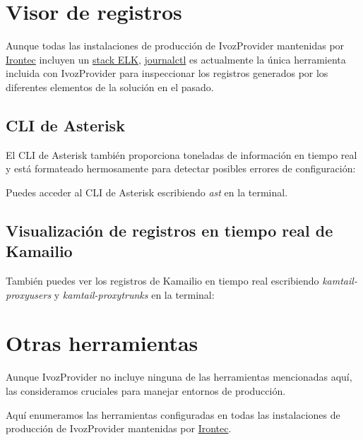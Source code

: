 \documentclass[letterpaper,10pt,spanish]{sphinxmanual}
\begin{document}
\section{Visor de registros}
\label{security_and_maintenance/maintenance/log_viewer::doc}\label{security_and_maintenance/maintenance/log_viewer:log-viewer}
Aunque todas las instalaciones de producción de IvozProvider mantenidas por \href{https://www.irontec.com}{Irontec} incluyen un \href{https://www.elastic.co/elk-stack}{stack ELK}, \href{https://www.freedesktop.org/software/systemd/man/journalctl.html}{journalctl} es actualmente la única herramienta incluida con IvozProvider para inspeccionar los registros generados por los diferentes elementos de la solución en el pasado.


\subsection{CLI de Asterisk}
\label{security_and_maintenance/maintenance/log_viewer:asterisk-cli}
El CLI de Asterisk también proporciona toneladas de información en tiempo real y está formateado hermosamente para detectar posibles errores de configuración:

\noindent{}

Puedes acceder al CLI de Asterisk escribiendo \emph{ast} en la terminal.


\subsection{Visualización de registros en tiempo real de Kamailio}
\label{security_and_maintenance/maintenance/log_viewer:kamailio-realtime-log-viewing}
También puedes ver los registros de Kamailio en tiempo real escribiendo \emph{kamtail-proxyusers} y \emph{kamtail-proxytrunks} en la terminal:

\noindent{}


\section{Otras herramientas}
\label{security_and_maintenance/maintenance/other_tools::doc}\label{security_and_maintenance/maintenance/other_tools:other-tools}
Aunque IvozProvider no incluye ninguna de las herramientas mencionadas aquí, las consideramos cruciales para manejar entornos de producción.

Aquí enumeramos las herramientas configuradas en todas las instalaciones de producción de IvozProvider mantenidas por \href{https://www.irontec.com}{Irontec}.
\end{document}
